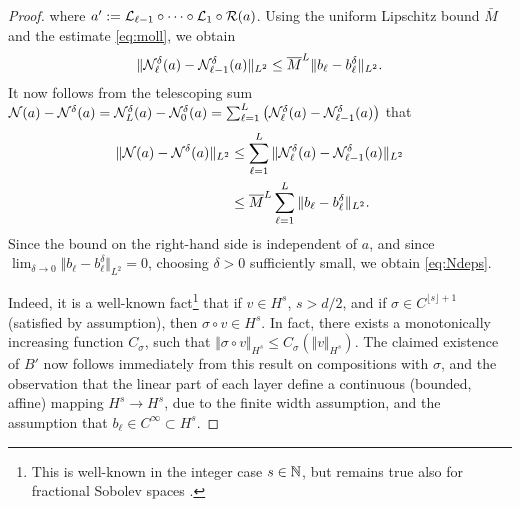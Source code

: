 \documentclass[reqno,a4paper]{amsart}
\begin{document}
\begin{proof}
where $a' := \mathcal{L}_{\ell-1} \circ \dots \circ \mathcal{L}_1 \circ \mathcal{R}(a)$. Using the uniform Lipschitz bound $\bar{M}$ and the estimate \eqref{eq:moll}, we obtain
\[
\Vert
\mathcal{N}^\delta_\ell(a) - \mathcal{N}^\delta_{\ell-1}(a)
\Vert_{L^2}
\le 
\overline{M}^L \Vert b_\ell - b_\ell^\delta \Vert_{L^2}.
\]
It now follows from the telescoping sum $\mathcal{N}(a) - \mathcal{N}^\delta(a) = \mathcal{N}^\delta_L(a) - \mathcal{N}^\delta_0(a) = \sum_{\ell=1}^L \left(\mathcal{N}^\delta_{\ell}(a) - \mathcal{N}^\delta_{\ell-1}(a)\right)$ that
\begin{align*}
\Vert 
\mathcal{N}(a) - \mathcal{N}^\delta(a)
\Vert_{L^2}
&\le
\sum_{\ell = 1}^{L}
\Vert \mathcal{N}^\delta_{\ell}(a) - \mathcal{N}^\delta_{\ell-1}(a)\Vert_{L^2}
\\
&\le
\overline{M}^L 
\sum_{\ell=1}^L \Vert b_\ell - b_\ell^\delta \Vert_{L^2}.
\end{align*}
Since the bound on the right-hand side is independent of $a$, and since $\lim_{\delta \to 0} \Vert b_\ell - b_\ell^\delta\Vert_{L^2} = 0$, choosing $\delta>0$ sufficiently small, we obtain \eqref{eq:Ndeps}.


Indeed, it is a well-known fact\footnote{This is well-known in the integer case $s\in \mathbb{N}$, but remains true also for fractional Sobolev spaces \cite{BM2001}.} that if $v\in H^s$, $s>d/2$, and if $\sigma \in C^{\lfloor s \rfloor + 1}$ (satisfied by assumption), then $\sigma \circ v \in H^s$. In fact, there exists a monotonically increasing function $C_\sigma$, such that $\Vert \sigma \circ v \Vert_{H^s} \le C_\sigma(\Vert v \Vert_{H^s})$. The claimed existence of $B'$ now follows immediately from this result on compositions with $\sigma$, and the observation that the linear part of each layer define a continuous (bounded, affine) mapping $H^s\to H^s$, due to the finite width assumption, and the assumption that $b_\ell \in C^\infty \subset H^s$.



\end{proof}
\end{document}
